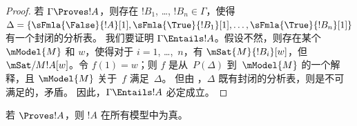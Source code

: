 \documentclass[../../../include/open-logic-section]{subfiles}
\begin{document}
\begin{proof}
  若 $\Gamma \Proves !A$，则存在 $!B_1$, \dots, $!B_n \in
  \Gamma$，使得 $\Delta = \{\sFmla{\False}{!A}[1], \sFmla{\True}{!B_1}[1],
  \dots, \sFmla{\True}{!B_n}[1]\}$ 有一个封闭的分析表。
  我们要证明 $\Gamma \Entails !A$。假设不然，则存在某个
  $\mModel{M}$ 和 $w$，使得对于 $i=1$, \dots,~$n$，有 $\mSat{M}{!B_i}[w]$，但
  $\mSat/{M}{!A}[w]$。令 $f(1) = w$；则 $f$ 是从~$P(\Delta)$ 到~$\mModel{M}$ 的一个解释，且 $\mModel{M}$ 关于~$f$ 满足~$\Delta$。
  但由 ，$\Delta$ 既有封闭的分析表，则是不可满足的，矛盾。
  因此，$\Gamma \Entails !A$ 必定成立。
\end{proof}

\begin{cor}
若 $\Proves !A$，则 $!A$ 在所有模型中为真。
\end{cor}
\end{document}

